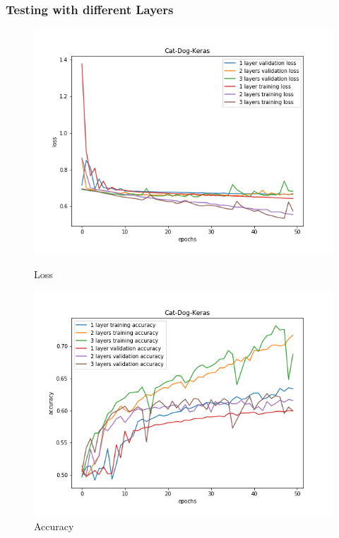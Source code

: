 \documentclass{article}
\begin{document}
\subsubsection{Testing with different Layers}

\begin{figure}[!htb]
	\includegraphics[width=\linewidth]{../output_plots/part_2_task_4_layers_loss.png}
	\caption{Loss}\label{fig:part_2_task_4_layers_loss}
	\endminipage\hfill
	\includegraphics[width=\linewidth]{../output_plots/part_2_task_4_layers_accuracy.png}
	\caption{Accuracy}\label{fig:part_2_task_4_layers_accuracy}
	\endminipage\hfill
\end{figure}
\end{document}
